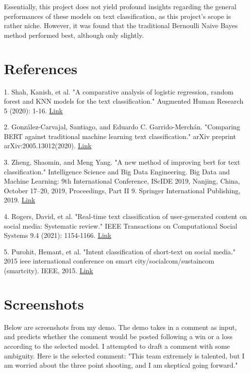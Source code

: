 \documentclass[twocolumn]{article}
\begin{document}
Essentially, this project does not yield profound insights regarding the general performances of these models on text classification, as this project's scope is rather niche. However, it was found that the traditional Bernoulli Naive Bayes method performed best, although only slightly.


\section{References}



1. Shah, Kanish, et al. "A comparative analysis of logistic regression, random forest and KNN models for the text classification." Augmented Human Research 5 (2020): 1-16. \href{https://link.springer.com/article/10.1007/s41133-020-00032-0}{Link}


2. González-Carvajal, Santiago, and Eduardo C. Garrido-Merchán. "Comparing BERT against traditional machine learning text classification." arXiv preprint arXiv:2005.13012(2020). \href{https://arxiv.org/abs/2005.13012}{Link}


3. Zheng, Shaomin, and Meng Yang. "A new method of improving bert for text classification." Intelligence Science and Big Data Engineering. Big Data and Machine Learning: 9th International Conference, IScIDE 2019, Nanjing, China, October 17–20, 2019, Proceedings, Part II 9. Springer International Publishing, 2019. \href{https://link.springer.com/chapter/10.1007/978-3-030-36204-1_37}{Link}


4. Rogers, David, et al. "Real-time text classification of user-generated content on social media: Systematic review." IEEE Transactions on Computational Social Systems 9.4 (2021): 1154-1166. \href{https://ieeexplore.ieee.org/abstract/document/9585425}{Link}


5. Purohit, Hemant, et al. "Intent classification of short-text on social media." 2015 ieee international conference on smart city/socialcom/sustaincom (smartcity). IEEE, 2015. \href{https://ieeexplore.ieee.org/abstract/document/7463729}{Link}

\section{Screenshots}

Below are screenshots from my demo. The demo takes in a comment as input, and predicts whether the comment would be posted following a win or a loss according to the selected model. I attempted to draft a comment with some ambiguity. Here is the selected comment: "This team extremely is talented, but I am worried about the three point shooting, and I am skeptical going forward."
\end{document}
